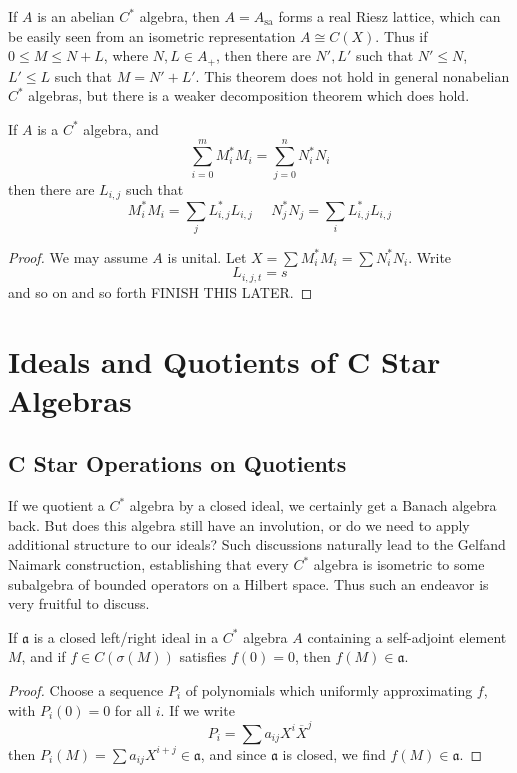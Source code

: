 If $A$ is an abelian $C^*$ algebra, then $A = A_{\text{sa}}$ forms a real Riesz lattice, which can be easily seen from an isometric representation $A \cong C(X)$. Thus if $0 \leq M \leq N + L$, where $N,L \in A_+$, then there are $N',L'$ such that $N' \leq N$, $L' \leq L$ such that $M = N' + L'$. This theorem does not hold in general nonabelian $C^*$ algebras, but there is a weaker decomposition theorem which does hold.

\begin{prop}
    If $A$ is a $C^*$ algebra, and
    \[ \sum_{i = 0}^m M_i^* M_i = \sum_{j = 0}^n N_i^* N_i \]
    then there are $L_{i,j}$ such that
    \[ M_i^* M_i = \sum_j L_{i,j}^* L_{i,j}\ \ \ \ \ \ N_j^* N_j = \sum_i L_{i,j}^* L_{i,j} \]
\end{prop}
\begin{proof}
    We may assume $A$ is unital. Let $X = \sum M_i^* M_i = \sum N_i^* N_i$. Write
    \[ L_{i,j,t} = s \]
    and so on and so forth FINISH THIS LATER.
\end{proof}







\section{Ideals and Quotients of C Star Algebras}

\subsection{C Star Operations on Quotients}

If we quotient a $C^*$ algebra by a closed ideal, we certainly get a Banach algebra back. But does this algebra still have an involution, or do we need to apply additional structure to our ideals? Such discussions naturally lead to the Gelfand Naimark construction, establishing that every $C^*$ algebra is isometric to some subalgebra of bounded operators on a Hilbert space. Thus such an endeavor is very fruitful to discuss.

\begin{prop}
    If $\mathfrak{a}$ is a closed left/right ideal in a $C^*$ algebra $A$ containing a self-adjoint element $M$, and if $f \in C(\sigma(M))$ satisfies $f(0) = 0$, then $f(M) \in \mathfrak{a}$.
\end{prop}
\begin{proof}
    Choose a sequence $P_i$ of polynomials which uniformly approximating $f$, with $P_i(0) = 0$ for all $i$. If we write
    \[ P_i = \sum a_{ij} X^i \overline{X}^j \]
    then $P_i(M) = \sum a_{ij} X^{i+j} \in \mathfrak{a}$, and since $\mathfrak{a}$ is closed, we find $f(M) \in \mathfrak{a}$.
\end{proof}

